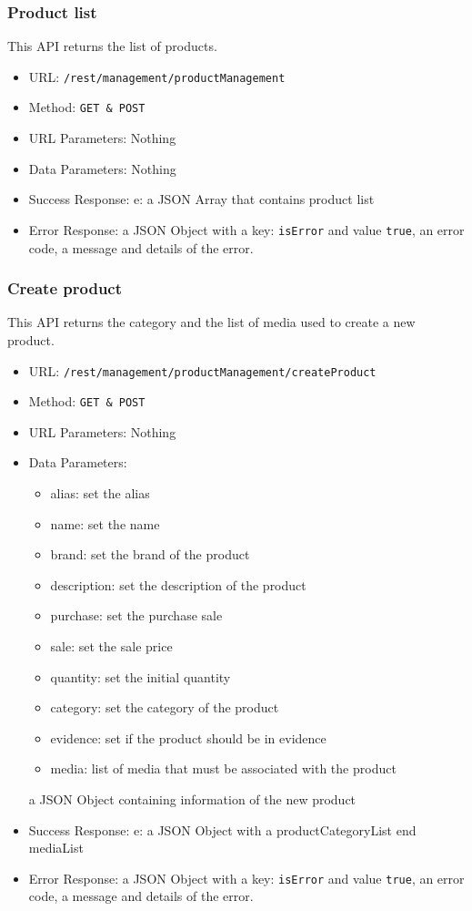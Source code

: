 \subsubsection*{Product list}
This API returns the list of products.

\begin{itemize}
    \item URL: \texttt{/rest/management/productManagement}
    \item Method: \texttt{{GET \& POST}}
    \item URL Parameters: Nothing
    \item Data Parameters: Nothing
    \item Success Response: e: a JSON Array that contains product list 
    \item Error Response: a JSON Object with a key: \texttt{isError}  and value \texttt{true}, an error code, a message and details of the error.
\end{itemize}

\subsubsection*{Create product}
This API returns the category and the list of media used to create a new product.

\begin{itemize}
    \item URL: \texttt{/rest/management/productManagement/createProduct}
    \item Method: \texttt{{GET \& POST}}
    \item URL Parameters: Nothing
    \item Data Parameters: 
    \begin{itemize}
        \item alias: set the alias
        \item name: set the name
        \item brand: set the brand of the product
        \item description: set the description of the product
        \item purchase: set the purchase sale
        \item sale: set the sale price
        \item quantity: set the initial quantity
        \item category: set the category of the product
        \item evidence: set if the product should be in evidence
        \item media: list of media that must be associated with the product
    \end{itemize}
    
    a JSON Object containing information of the new product
    \item Success Response: e: a JSON Object with a productCategoryList end mediaList
    \item Error Response: a JSON Object with a key: \texttt{isError}  and value \texttt{true}, an error code, a message and details of the error.
\end{itemize}


